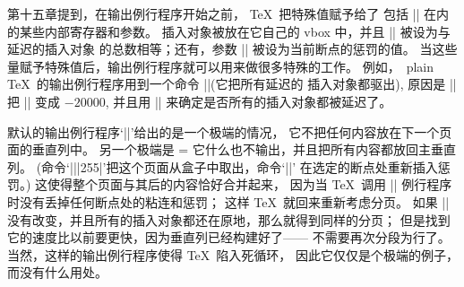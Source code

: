 \ddanger 第十五章提到，在输出例行程序开始之前， \TeX\ 把特殊值赋予给了%
包括 || 在内的某些内部寄存器和参数。%
插入对象被放在它自己的 vbox 中，并且 |\insertpenalties| 被设为与延迟的插入对象%
的总数相等；还有，参数 |\outputpenalty| 被设为当前断点的惩罚的值。%
当这些量赋予特殊值后，输出例行程序就可以用来做很多特殊的工作。%
例如，~plain \TeX\ 的输出例行程序用到一个命令 |\supereject|(它把所有延迟的%
插入对象都驱出), 原因是 |\supereject| 把 |\outputpenalty| 变成 $-20000$,
并且用 |\insertpenalties| 来确定是否所有的插入对象都被延迟了。

\ddanger 默认的输出例行程序`|\shipout{}|'给出的是一个极端的情况，
它不把任何内容放在下一个页面的垂直列中。%
另一个极端是
\begintt
\output={ \penalty\outputpenalty}
\endtt
它什么也不输出，并且把{所有内容}都放回主垂直列。%
(命令`|\unvbox||255|'把这个页面从盒子中取出，命令`|\penalty\outputpenalty|'%
在选定的断点处重新插入惩罚。)
这使得整个页面与其后的内容恰好合并起来，
因为当 \TeX\ 调用 |\output| 例行程序时没有丢掉任何断点处的粘连和惩罚；
这样 \TeX\ 就回来重新考虑分页。%
如果 |\vsize| 没有改变，并且所有的插入对象都还在原地，那么就得到同样的分页；
但是找到它的速度比以前要更快，因为垂直列已经构建好了——%
不需要再次分段为行了。%
当然，这样的输出例行程序使得 \TeX\ 陷入死循环，
因此它仅仅是个极端的例子，而没有什么用处。

